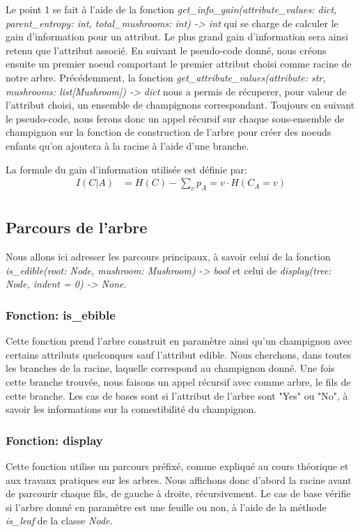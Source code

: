 \documentclass[utf8]{article}
\begin{document}
Le point 1 se fait à l'aide de la fonction \emph{get\_info\_gain(attribute\_values: dict, parent\_entropy: int, total\_mushrooms: int) -> int} qui se charge de calculer le gain d'information pour un
attribut. Le plus grand gain d'information sera ainsi retenu que l'attribut associé. En suivant le pseudo-code donné, nous créons ensuite un premier noeud comportant le premier attribut choisi comme racine de notre arbre.
Précédemment, la fonction \emph{get\_attribute\_values(attribute: str, mushrooms: list[Mushroom]) -> dict} nous a permis de récuperer, pour valeur de l'attribut choisi, un ensemble de champignons correspondant. Toujours
en suivant le pseudo-code, nous ferons donc un appel récursif sur chaque sous-ensemble de champignon sur la fonction de construction de l'arbre pour créer des noeuds enfants qu'on ajoutera à la racine à l'aide d'une branche.
\newline

La formule du gain d'information utilisée est définie par:
\begin{align*}
    I(C|A) &= H(C) - \sum_{v} p_A=v \cdot H(C_A=v) \\
\end{align*}


\subsection{Parcours de l'arbre}
\label{sec:treeparcour}
Nous allons ici adresser les parcours principaux, à savoir celui de la fonction \emph{is\_edible(root: Node, mushroom: Mushroom) -> bool} et celui de \emph{display(tree: Node, indent = 0) -> None}.

\subsubsection{Fonction: is\_ebible}
Cette fonction prend l'arbre construit en paramètre ainsi qu'un champignon avec certains attributs quelconques sauf l'attribut edible. Nous cherchons, dans toutes les branches de la racine, laquelle correspond au champignon donné.
Une fois cette branche trouvée, nous faisons un appel récursif avec comme arbre, le fils de cette branche. Les cas de bases sont si l'attribut de l'arbre sont "Yes" ou "No", à savoir les informations sur la comestibilité du champignon.

\subsubsection{Fonction: display}
Cette fonction utilise un parcours préfixé, comme expliqué au cours théorique et aux travaux pratiques sur les arbres. Nous affichons donc d'abord la racine avant de parcourir chaque fils, de gauche à droite, récursivement. Le
cas de base vérifie si l'arbre donné en paramètre est une feuille ou non, à l'aide de la méthode \emph{is\_leaf} de la classe \emph{Node}.
\end{document}
